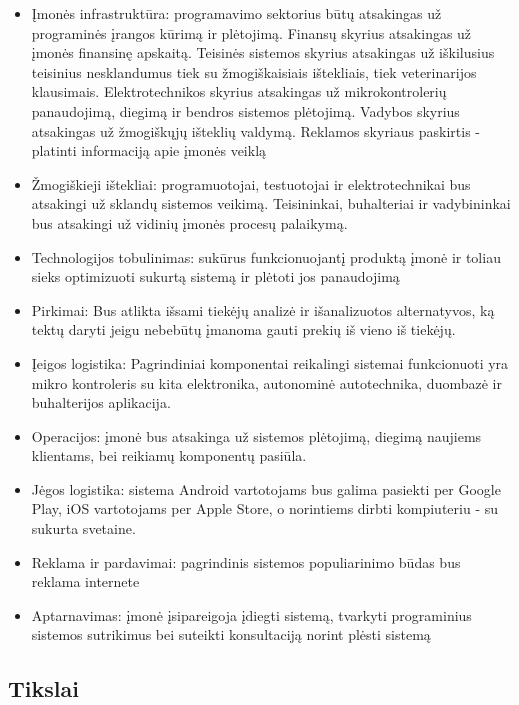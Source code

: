 \documentclass[oneside]{VUMIFPSkursinis}
\begin{document}
	\begin{itemize}
		\item{Įmonės infrastruktūra: programavimo sektorius būtų atsakingas už programinės įrangos kūrimą ir plėtojimą. Finansų skyrius atsakingas už įmonės finansinę apskaitą. Teisinės sistemos skyrius atsakingas už iškilusius teisinius nesklandumus tiek su žmogiškaisiais ištekliais, tiek veterinarijos klausimais. Elektrotechnikos skyrius atsakingas už mikrokontrolerių panaudojimą, diegimą ir bendros sistemos plėtojimą. Vadybos skyrius atsakingas už žmogiškųjų išteklių valdymą. Reklamos skyriaus paskirtis - platinti informaciją apie įmonės veiklą }
		\item{Žmogiškieji ištekliai: programuotojai, testuotojai ir elektrotechnikai bus atsakingi už sklandų sistemos veikimą. Teisininkai, buhalteriai ir vadybininkai bus atsakingi už vidinių įmonės procesų palaikymą. }
		\item{Technologijos tobulinimas: sukūrus funkcionuojantį produktą įmonė ir toliau sieks optimizuoti sukurtą sistemą ir plėtoti jos panaudojimą }
		\item{Pirkimai: Bus atlikta išsami tiekėjų analizė ir išanalizuotos alternatyvos, ką tektų daryti jeigu nebebūtų įmanoma gauti prekių iš vieno iš tiekėjų.}
		\item{Įeigos logistika: Pagrindiniai komponentai reikalingi sistemai funkcionuoti yra mikro kontroleris su kita elektronika, autonominė autotechnika, duombazė ir buhalterijos aplikacija.}
		\item{Operacijos: įmonė bus atsakinga už sistemos plėtojimą, diegimą naujiems klientams, bei reikiamų komponentų pasiūla.}
		\item{Jėgos logistika: sistema Android vartotojams bus galima pasiekti per Google Play, iOS vartotojams per Apple Store, o norintiems dirbti kompiuteriu - su sukurta svetaine.}
		\item{Reklama ir pardavimai: pagrindinis sistemos populiarinimo būdas bus reklama internete}
		\item{Aptarnavimas: įmonė įsipareigoja įdiegti sistemą, tvarkyti programinius sistemos sutrikimus bei suteikti konsultaciją norint plėsti sistemą }


	\end{itemize}

	
	\subsection{Tikslai}
\end{document}
